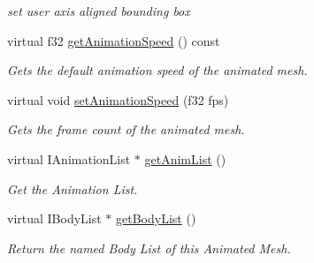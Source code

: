 \begin{DoxyCompactItemize}
\begin{DoxyCompactList}\small\item\em set user axis aligned bounding box \end{DoxyCompactList}\item 
virtual f32 \hyperlink{classirr_1_1scene_1_1_c_animated_mesh_half_life_a1867bdfd4534022cd8c868cd392b446b}{get\-Animation\-Speed} () const 
\begin{DoxyCompactList}\small\item\em Gets the default animation speed of the animated mesh. \end{DoxyCompactList}\item 
virtual void \hyperlink{classirr_1_1scene_1_1_c_animated_mesh_half_life_a9e3f22fb73db4c3d8f2aaa85195a00de}{set\-Animation\-Speed} (f32 fps)
\begin{DoxyCompactList}\small\item\em Gets the frame count of the animated mesh. \end{DoxyCompactList}\item 
\hypertarget{classirr_1_1scene_1_1_c_animated_mesh_half_life_a788e3dabfd81c94471c901ba42b7966e}{virtual I\-Animation\-List $\ast$ \hyperlink{classirr_1_1scene_1_1_c_animated_mesh_half_life_a788e3dabfd81c94471c901ba42b7966e}{get\-Anim\-List} ()}\label{classirr_1_1scene_1_1_c_animated_mesh_half_life_a788e3dabfd81c94471c901ba42b7966e}

\begin{DoxyCompactList}\small\item\em Get the Animation List. \end{DoxyCompactList}\item 
\hypertarget{classirr_1_1scene_1_1_c_animated_mesh_half_life_a37dc683e8e85503ce06d3c9f2f02804f}{virtual I\-Body\-List $\ast$ \hyperlink{classirr_1_1scene_1_1_c_animated_mesh_half_life_a37dc683e8e85503ce06d3c9f2f02804f}{get\-Body\-List} ()}\label{classirr_1_1scene_1_1_c_animated_mesh_half_life_a37dc683e8e85503ce06d3c9f2f02804f}

\begin{DoxyCompactList}\small\item\em Return the named Body List of this Animated Mesh. \end{DoxyCompactList}\end{DoxyCompactItemize}


